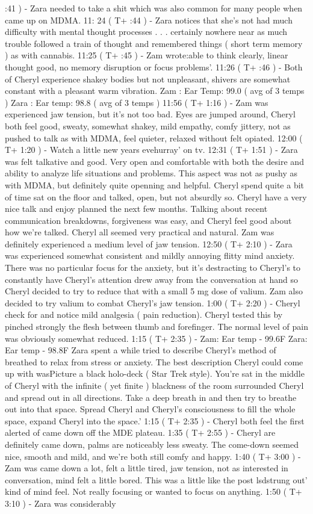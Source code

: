 \documentclass[12pt]{book}
\begin{document}
:41 ) - Zara needed to take a shit which was also common for many people when came up on MDMA. 11: 24 ( T+ :44 ) - Zara notices that she's not had much difficulty with mental thought processes  . . .  certainly nowhere near as much trouble followed a train of thought and remembered things ( short term memory ) as with cannabis. 11:25 ( T+ :45 ) - Zam wrote:able to think clearly, linear thought good, no memory disruption or focus problems'. 11:26 ( T+ :46 ) - Both of Cheryl experience shakey bodies but not unpleasant, shivers are somewhat constant with a pleasant warm vibration. Zam : Ear Temp: 99.0 ( avg of 3 temps ) Zara : Ear temp: 98.8 ( avg of 3 temps ) 11:56 ( T+ 1:16 ) - Zam was experienced jaw tension, but it's not too bad. Eyes are jumped around, Cheryl both feel good, sweaty, somewhat shakey, mild empathy, comfy jittery, not as pushed to talk as with MDMA, feel quieter, relaxed without felt opiated. 12:00 ( T+ 1:20 ) - Watch a little new years evehurray' on tv. 12:31 ( T+ 1:51 ) - Zara was felt talkative and good. Very open and comfortable with both the desire and ability to analyze life situations and problems. This aspect was not as pushy as with MDMA, but definitely quite openning and helpful. Cheryl spend quite a bit of time sat on the floor and talked, open, but not absurdly so. Cheryl have a very nice talk and enjoy planned the next few months. Talking about recent communication breakdowns, forgiveness was easy, and Cheryl feel good about how we're talked. Cheryl all seemed very practical and natural. Zam was definitely experienced a medium level of jaw tension. 12:50 ( T+ 2:10 ) - Zara was experienced somewhat consistent and mildly annoying flitty mind anxiety. There was no particular focus for the anxiety, but it's destracting to Cheryl's to constantly have Cheryl's attention drew away from the conversation at hand so Cheryl decided to try to reduce that with a small 5 mg dose of valium. Zam also decided to try valium to combat Cheryl's jaw tension. 1:00 ( T+ 2:20 ) - Cheryl check for and notice mild analgesia ( pain reduction). Cheryl tested this by pinched strongly the flesh between thumb and forefinger. The normal level of pain was obviously somewhat reduced. 1:15 ( T+ 2:35 ) - Zam: Ear temp - 99.6F Zara: Ear temp - 98.8F Zara spent a while tried to describe Cheryl's method of breathed to relax from stress or anxiety. The best description Cheryl could come up with wasPicture a black holo-deck ( Star Trek style). You're sat in the middle of Cheryl with the infinite ( yet finite ) blackness of the room surrounded Cheryl and spread out in all directions. Take a deep breath in and then try to breathe out into that space. Spread Cheryl and Cheryl's consciousness to fill the whole space, expand Cheryl into the space.' 1:15 ( T+ 2:35 ) - Cheryl both feel the first alerted of came down off the MDE plateau. 1:35 ( T+ 2:55 ) - Cheryl are definitely came down, palms are noticeably less sweaty. The come-down seemed nice, smooth and mild, and we're both still comfy and happy. 1:40 ( T+ 3:00 ) - Zam was came down a lot, felt a little tired, jaw tension, not as interested in conversation, mind felt a little bored. This was a little like the post lsdstrung out' kind of mind feel. Not really focusing or wanted to focus on anything. 1:50 ( T+ 3:10 ) - Zara was considerably 
\end{document}
